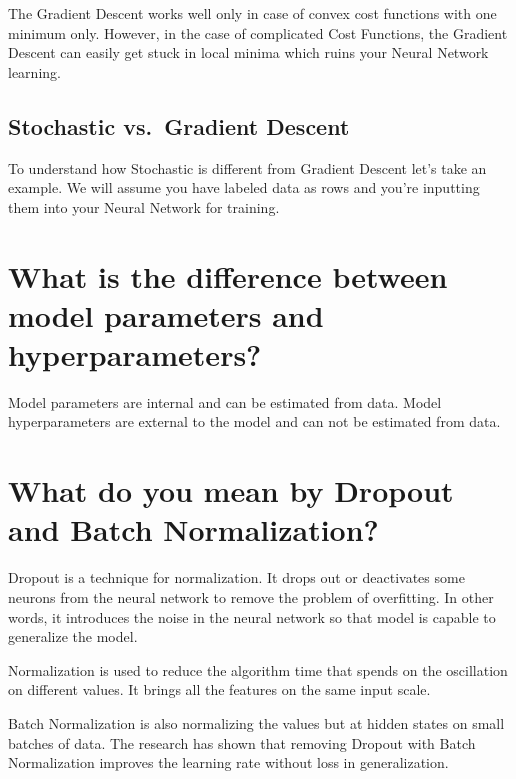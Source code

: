 \documentclass[
]{book}
\begin{document}
The Gradient Descent works well only in case of convex cost functions with one minimum only. However, in the case of complicated Cost Functions, the Gradient Descent can easily get stuck in local minima which ruins your Neural Network learning.

\hypertarget{stochastic-vs.-gradient-descent}{%
\subsection{Stochastic vs.~Gradient Descent}\label{stochastic-vs.-gradient-descent}}

To understand how Stochastic is different from Gradient Descent let's take an example. We will assume you have labeled data as rows and you're inputting them into your Neural Network for training.

\hypertarget{what-is-the-difference-between-model-parameters-and-hyperparameters}{%
\section{What is the difference between model parameters and hyperparameters?}\label{what-is-the-difference-between-model-parameters-and-hyperparameters}}

Model parameters are internal and can be estimated from data. Model hyperparameters are external to the model and can not be estimated from data.

\hypertarget{what-do-you-mean-by-dropout-and-batch-normalization}{%
\section{What do you mean by Dropout and Batch Normalization?}\label{what-do-you-mean-by-dropout-and-batch-normalization}}

Dropout is a technique for normalization. It drops out or deactivates some neurons from the neural network to remove the problem of overfitting. In other words, it introduces the noise in the neural network so that model is capable to generalize the model.

Normalization is used to reduce the algorithm time that spends on the oscillation on different values. It brings all the features on the same input scale.

Batch Normalization is also normalizing the values but at hidden states on small batches of data. The research has shown that removing Dropout with Batch Normalization improves the learning rate without loss in generalization.
\end{document}
